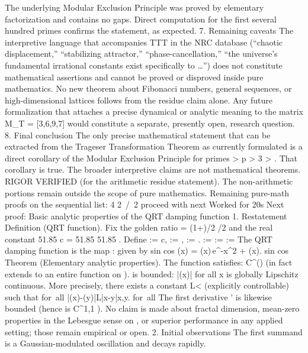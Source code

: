 The underlying Modular Exclusion Principle was proved by elementary factorization and contains no gaps.
Direct computation for the first several hundred primes confirms the statement, as expected.
7. Remaining caveats
The interpretive language that accompanies TTT in the NRC database (“chaotic displacement,” “stabilizing attractor,” “phase-cancellation,” “the universe’s fundamental irrational constants exist specifically to \ldots”) does not constitute mathematical assertions and cannot be proved or disproved inside pure mathematics.
No new theorem about Fibonacci numbers, general sequences, or high-dimensional lattices follows from the residue claim alone.
Any future formalization that attaches a precise dynamical or analytic meaning to the matrix
M_T = [3,6,9,7]
would constitute a separate, presently open, research question.
8. Final conclusion
The only precise mathematical statement that can be extracted from the Trageser Transformation Theorem as currently formulated is a direct corollary of the Modular Exclusion Principle for primes
>
p > 3
>
. That corollary is true. The broader interpretive claims are not mathematical theorems.
RIGOR VERIFIED
(for the arithmetic residue statement).
The non-arithmetic portions remain outside the scope of pure mathematics.
Remaining pure-math proofs on the sequential list: 4
2 / 2
proceed with next
Worked for 20s
Next proof: Basic analytic properties of the QRT damping function
1. Restatement
Definition (QRT function).
Fix the golden ratio
\varphi = (1+)/2
/2
and the real constant
51.85
c = 51.85
51.85
. Define
\alpha := \varphi{}\cdot c, \qquad
\beta := , \qquad
\gamma := \frac{\pi}{\varphi}.
:=
:=
:=
The QRT damping function is the map
\psi:\to{}
given by
sin
cos
\psi(x) = \sin(\alpha x)\,e^{-\beta x^2} + \cos(\gamma x).
sin
cos
Theorem (Elementary analytic properties).
The function
\psi
satisfies:
\psi\in C^\infty()
(in fact
\psi
extends to an entire function on
).
\psi
is bounded:
|\psi(x)|
for all
x\in{}
\psi
is globally Lipschitz continuous. More precisely, there exists a constant
L<\infty
(explicitly controllable) such that
for all
|\psi(x)-\psi(y)|\le L|x-y|\qquad{}x,y\in{}.
for all
The first derivative
\psi'
is likewise bounded (hence
\psi
is
C^{1,1}
).
No claim is made about fractal dimension, mean-zero properties in the Lebesgue sense on
, or superior performance in any applied setting; those remain empirical or open.
2. Initial observations
The first summand is a Gaussian-modulated oscillation and decays rapidly.

